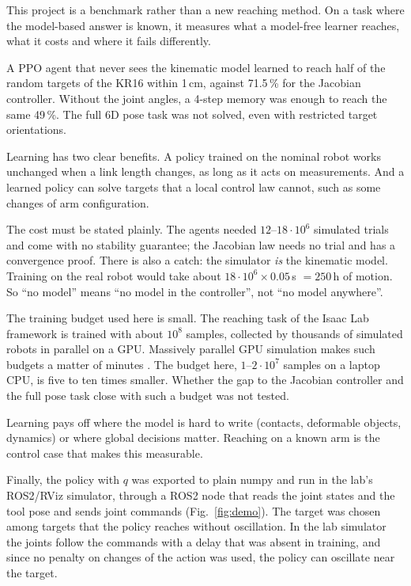 \documentclass[10pt,a4paper]{article}
\newcommand{\head}[1]{\vspace{4pt}{\large\bfseries #1}\par}
\begin{document}
\head{7. Conclusion}
This project is a benchmark rather than a new reaching method.
On a task where the model-based answer is known, it measures what a model-free learner reaches, what it costs and where it fails differently.

A PPO agent that never sees the kinematic model learned to reach half of the random targets of the KR16 within 1\,cm, against 71.5\,\% for the Jacobian controller.
Without the joint angles, a 4-step memory was enough to reach the same 49\,\%.
The full 6D pose task was not solved, even with restricted target orientations.

Learning has two clear benefits.
A policy trained on the nominal robot works unchanged when a link length changes, as long as it acts on measurements.
And a learned policy can solve targets that a local control law cannot, such as some changes of arm configuration.

The cost must be stated plainly.
The agents needed $12$--$18\cdot10^6$ simulated trials and come with no stability guarantee; the Jacobian law needs no trial and has a convergence proof.
There is also a catch: the simulator \emph{is} the kinematic model.
Training on the real robot would take about $18\cdot10^6 \times 0.05$\,s $= 250$\,h of motion.
So ``no model'' means ``no model in the controller'', not ``no model anywhere''.

The training budget used here is small.
The reaching task of the Isaac Lab framework \cite{orbit} is trained with about $10^8$ samples, collected by thousands of simulated robots in parallel on a GPU.
Massively parallel GPU simulation makes such budgets a matter of minutes \cite{isaacgym, rudin}.
The budget here, $1$--$2\cdot10^7$ samples on a laptop CPU, is five to ten times smaller.
Whether the gap to the Jacobian controller and the full pose task close with such a budget was not tested.

Learning pays off where the model is hard to write (contacts, deformable objects, dynamics) or where global decisions matter.
Reaching on a known arm is the control case that makes this measurable.

Finally, the policy with $q$ was exported to plain numpy and run in the lab's ROS2/RViz simulator, through a ROS2 node that reads the joint states and the tool pose and sends joint commands (Fig.~\ref{fig:demo}).
The target was chosen among targets that the policy reaches without oscillation.
In the lab simulator the joints follow the commands with a delay that was absent in training, and since no penalty on changes of the action was used, the policy can oscillate near the target.
\end{document}
